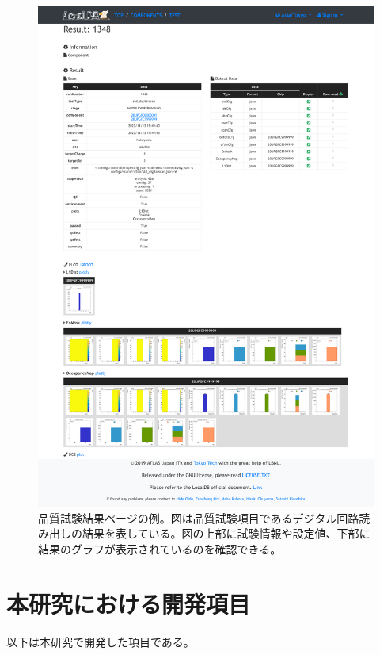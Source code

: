 \begin{figure}[bpt]\centering
\includegraphics[width=15cm]{./demo_view_scan_result.pdf}
\caption[品質試験結果ページの例]{品質試験結果ページの例。図は品質試験項目であるデジタル回路読み出しの結果を表している。図の上部に試験情報や設定値、下部に結果のグラフが表示されているのを確認できる。}
\label{viewer_result}
\end{figure}


\clearpage
\section{本研究における開発項目}
以下は本研究で開発した項目である。

